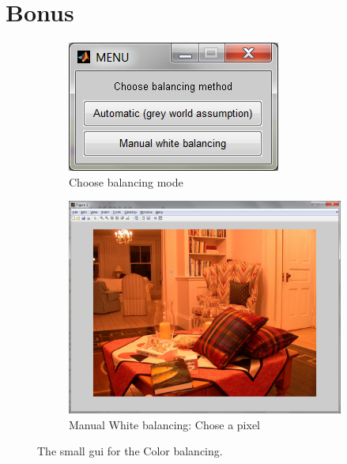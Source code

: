 \documentclass[a4paper]{article}
\begin{document}
\section{Bonus}
\begin{figure}[H]
	\begin{subfigure}[h]{0.3\textwidth}
		\centering
		\includegraphics[width=\textwidth]{gui1}
		\caption*{Choose balancing mode}
	\end{subfigure}
	
	\vspace{3mm}
	\begin{subfigure}[h]{0.8\textwidth}
		\centering
		\includegraphics[width=\textwidth]{gui2}
		\caption*{Manual White balancing: Chose a pixel}
	\end{subfigure}
\caption{The small gui for the Color balancing.}
\label{fig:concert-balance}
\end{figure}
\end{document}
